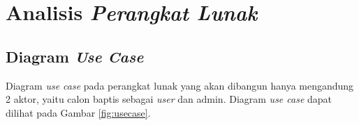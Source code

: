 	
	
	
	
\section{Analisis \textit{Perangkat Lunak}}
\label{sec:analisisusecase}
\subsection{Diagram \textit{Use Case}}
\label{sec:diagramusecase}
	Diagram \textit{use case} pada perangkat lunak yang akan dibangun hanya mengandung 2 aktor, yaitu calon baptis sebagai \textit{user} dan admin.  Diagram \textit{use case} dapat dilihat pada Gambar  \ref{fig:usecase}.

